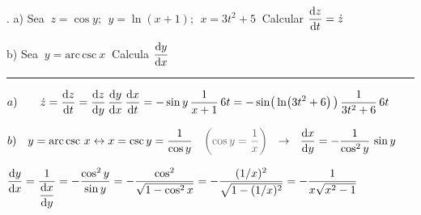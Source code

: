\vspace{1cm}
\begin{miejercicio}
.	a) Sea $\ z=\cos y;\ \ y=\ln(x+1);\ \ x=3t^2+5\ $ Calcular $\displaystyle \dv{z}{t}=\dot z$

	b) Sea $\ y=\mathrm{arc} \, \mathrm{csc} \ x\ $ Calcula $\displaystyle \dv{y}{x}$

\color{teal!80}
\rule{200pt}{0.2pt}
\color{black}
\vspace{5mm}
	
	$a)\qquad \displaystyle \dot z=\dv{z}{t}=\dv{z}{y}\, \dv{y}{x}\, \dv{x}{t}= -\sin y\, \dfrac 1{x+1}\, 6t = -\sin(\, \ln(3t^2+6)\, ) \, \dfrac{1}{3t^2+6}\, 6t$
	
\vspace{3mm} $b)\quad \displaystyle y=\mathrm{arc} \, \mathrm{csc} \ x  \leftrightarrow  x=\mathrm{csc}\, y=\dfrac 1{\cos y} \quad \textcolor{gris}{\left( \cos y=\dfrac 1 x \right) } \ \  \to \ \  \dv{x}{y}=-\dfrac{1}{\cos^2 y}\, \sin y \quad$ 
	
\vspace{3mm}  $\displaystyle \dv{y}{x}=\dfrac{1}{\displaystyle \dv{x}{y}}=-\dfrac{\cos^2 y}{\sin y}=-\dfrac{\cos^2}{\sqrt{1-\cos^2 x}}=-\dfrac {(1/x)^2}{\sqrt{1-(1/x)^2}}=-\dfrac{1}{x\sqrt{x^2-1}} \quad$ 

\end{miejercicio}

